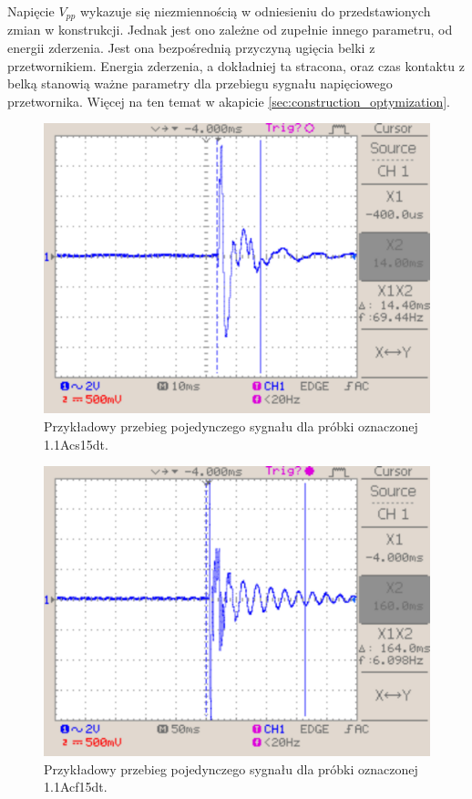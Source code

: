 Napięcie $V_{pp}$ wykazuje się niezmiennością w odniesieniu do przedstawionych zmian w konstrukcji. Jednak jest ono zależne od zupełnie innego parametru, od energii zderzenia. Jest ona bezpośrednią przyczyną ugięcia belki z przetwornikiem. Energia zderzenia, a dokładniej ta stracona, oraz czas kontaktu z belką stanowią ważne parametry dla przebiegu sygnału napięciowego przetwornika. Więcej na ten temat w akapicie \ref{sec:construction_optymization}.

\begin{figure}[htbp]
\centering
\includegraphics[width=\linewidth]{pictures/1Acs15dt.jpg}
\caption{Przykładowy przebieg pojedynczego sygnału dla próbki oznaczonej 1.1Acs15dt.}
\label{fig:scope_without_silencer}
\end{figure}

\begin{figure}[htbp]
\centering
\includegraphics[width=\linewidth]{pictures/1Acf15dt.jpg}
\caption{Przykładowy przebieg pojedynczego sygnału dla próbki oznaczonej 1.1Acf15dt.}
\label{fig:scope_with_silencer}
\end{figure}
